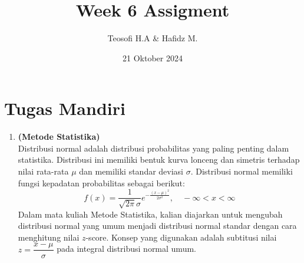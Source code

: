 \documentclass{article}
\title{\textbf{Week 6 Assigment}}
\date{21 Oktober 2024}
\author{Teosofi H.A \& Hafidz M.}
\begin{document}
    \maketitle

    \section*{Tugas Mandiri}
    \begin{enumerate}[label=]
        \item \textbf{(Metode Statistika)}\\
        Distribusi normal adalah distribusi probabilitas yang paling penting dalam statistika. Distribusi ini memiliki bentuk kurva lonceng dan simetris terhadap nilai rata-rata $\mu$ dan memiliki standar deviasi $\sigma$. Distribusi normal memiliki fungsi kepadatan probabilitas sebagai berikut:
        \begin{equation*}
            f(x)=\dfrac{1}{\sqrt{2\pi}\sigma}e^{-\frac{(x-\mu)^2}{2\sigma^2}},\quad -\infty<x<\infty
        \end{equation*} 
        Dalam mata kuliah Metode Statistika, kalian diajarkan untuk mengubah distribusi normal yang umum menjadi distribusi normal standar dengan cara menghitung nilai $z$-score. Konsep yang digunakan adalah subtitusi nilai $z=\dfrac{x-\mu}{\sigma}$ pada integral distribusi normal umum.\\
        \begin{figure}[h!]
          \centering
\end{figure}
\end{enumerate}
\end{document}
